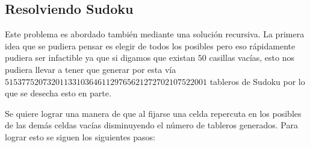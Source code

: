 \documentclass[a4paper,10pt,twocolumn]{article}
\begin{document}
\subsection{Resolviendo Sudoku }

Este problema es abordado también mediante una solución recursiva. La primera idea que se pudiera pensar es elegir de todos los posibles pero eso rápidamente pudiera ser infactible ya que si digamos que existan $50$ casillas vacías, esto nos pudiera llevar a tener que generar por esta vía $515377520732011331036461129765621272702107522001$ tableros de Sudoku por lo que se desecha esto en parte.

Se quiere lograr una manera de que al fijarse una celda repercuta en los posibles de las demás celdas vacías disminuyendo el número de tableros generados. Para lograr esto se siguen los siguientes pasos:
\end{document}
